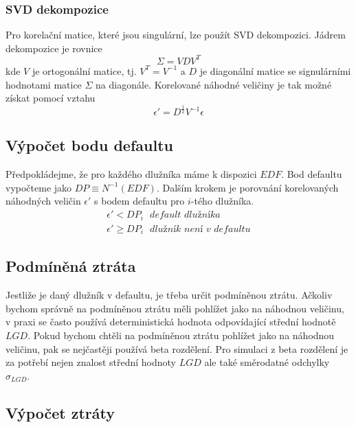 \subsubsection{SVD dekompozice}

Pro korelační matice, které jsou singulární, lze použít SVD dekompozici. Jádrem dekompozice je rovnice
\begin{equation*}
\Sigma = V D V^T
\end{equation*}
kde $V$ je ortogonální matice, tj. $V^T = V^{-1}$ a $D$ je diagonální matice se signulárními hodnotami matice $\Sigma$ na diagonále. Korelované náhodné veličiny je tak možné získat pomocí vztahu
\begin{equation*}
\epsilon' = D^{\frac{1}{2}}V^{-1}\epsilon
\end{equation*}

\subsection{Výpočet bodu defaultu}

Předpokládejme, že pro každého dlužníka máme k dispozici $EDF$. Bod defaultu vypočteme jako $DP \equiv N^{-1}(EDF)$. Dalším krokem je porovnání korelovaných náhodných veličin $\epsilon'$ s bodem defaultu pro $i$-tého dlužníka.
\begin{align*}
\epsilon' < DP_i ~~~ \textit{default dlužníka}\\
\epsilon' \ge DP_i ~~~ \textit{dlužník není v defaultu}
\end{align*}

\subsection{Podmíněná ztráta}

Jestliže je daný dlužník v defaultu, je třeba určit podmíněnou ztrátu. Ačkoliv bychom správně na podmíněnou ztrátu měli pohlížet jako na náhodnou veličinu, v praxi se často používá deterministická hodnota odpovídající střední hodnotě $LGD$. Pokud bychom chtěli na podmíněnou ztrátu pohlížet jako na náhodnou veličinu, pak se nejčastěji používá beta rozdělení. Pro simulaci z beta rozdělení je za potřebí nejen znalost střední hodnoty $LGD$ ale také směrodatné odchylky $\sigma_{LGD}$.

\subsection{Výpočet ztráty}

